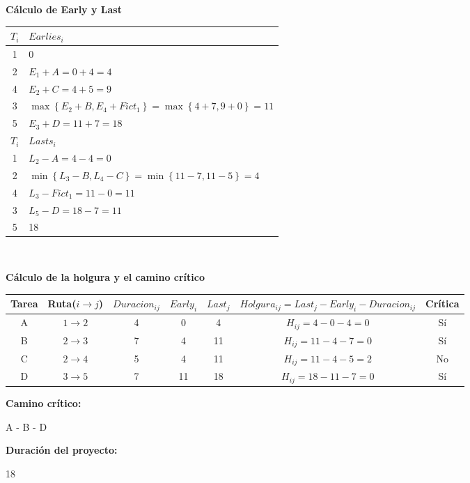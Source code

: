\documentclass{llncs}
\begin{document}
\vspace{0.5cm}

\textbf{Cálculo de Early y Last}
\begin{table}
\label{tab:tabla2}
\centering
\begin{tabular}{C|l}
\toprule
$T_i$ & $Earlies_i$ \\
 & 0 \\
 & $E_1 + A = 0 + 4 = 4$ \\
 & $E_2 + C = 4 + 5 = 9$ \\
 & $\max \left\{ E_2 + B, E_4 + Fict_1 \right\} = \max \left\{ 4 + 7, 9 + 0 \right\} = 11$ \\
 & $E_3 + D = 11 + 7 = 18$ \\
\bottomrule
\toprule
$T_i$ & $Lasts_i$ \\
 & $L_2 - A = 4 - 4 = 0$ \\
 & $\min \left\{ L_3 - B, L_4 - C \right\} = \min \left\{ 11 - 7, 11 - 5 \right\} = 4$ \\
 & $L_3 - Fict_1 = 11 - 0 = 11$ \\
 & $L_5 - D = 18 - 7 = 11$ \\
 & 18 \\
\bottomrule
\end{tabular}
\end{table} \\

\newpage

\textbf{Cálculo de la holgura y el camino crítico}
\begin{table}
\label{tab:tabla3}
\centering
\begin{tabular}{C|CCCCcC}
\toprule
Tarea & Ruta($i \rightarrow j$) & $Duracion_{ij}$ & $Early_i$ & $Last_j$ & $Holgura_{ij} = Last_j - Early_i - Duracion_{ij}$ & Crítica \\
\midrule
A & $1 \rightarrow 2$ & 4 & 0 & 4 & $H_{ij} = 4 - 0 - 4 = 0$ & Sí \\
B & $2 \rightarrow 3$ & 7 & 4 & 11 & $H_{ij} = 11 - 4 - 7 = 0$ & Sí \\
C & $2 \rightarrow 4$ & 5 & 4 & 11 & $H_{ij} = 11 - 4 - 5 = 2$ & No \\
D & $3 \rightarrow 5$ & 7 & 11 & 18 & $H_{ij} = 18 - 11 - 7 = 0$ & Sí \\
\bottomrule
\end{tabular}
\end{table}

\begin{multicols}{2}
\textbf{Camino crítico:}

A - B - D

\textbf{Duración del proyecto:}

18
\end{multicols}
\end{document}
